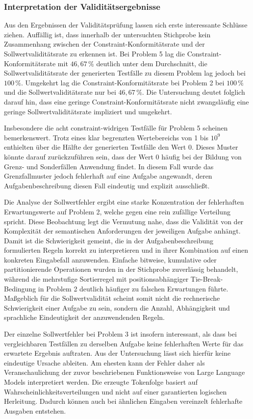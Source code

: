 \subsubsection{Interpretation der Validitätsergebnisse}
Aus den Ergebnissen der Validitätsprüfung lassen sich erste interessante Schlüsse ziehen.
Auffällig ist, dass innerhalb der untersuchten Stichprobe kein Zusammenhang zwischen der 
Constraint-Konformitätsrate und der Sollwertvaliditätsrate zu erkennen ist. Bei Problem 5 lag die 
Constraint-Konformitätsrate mit \(46{,}67\,\%\) deutlich unter dem Durchschnitt, die Sollwertvaliditätsrate 
der generierten Testfälle zu diesem Problem lag jedoch bei \(100\,\%\). 
Umgekehrt lag die Constraint-Konformitätsrate bei Problem 2 bei \(100\,\%\) und die Sollwertvaliditätsrate 
nur bei \(46{,}67\,\%\). Die Untersuchung deutet folglich darauf hin, dass eine geringe Constraint-Konformitätsrate 
nicht zwangsläufig eine geringe Sollwertvaliditätsrate impliziert und umgekehrt.

Insbesondere die acht constraint-widrigen Testfälle für Problem 5 scheinen bemerkenswert. 
Trotz eines klar begrenzten Wertebereichs von 1 bis \(10^9\) enthielten über die Hälfte der generierten Testfälle den Wert 0. 
Dieses Muster könnte darauf zurückzuführen sein, dass der Wert 0 häufig bei der Bildung von Grenz- und Sonderfällen Anwendung findet. 
In diesem Fall wurde das Grenzfallmuster jedoch fehlerhaft auf eine Aufgabe angewandt, deren Aufgabenbeschreibung diesen Fall eindeutig 
und explizit ausschließt.

Die Analyse der Sollwertfehler ergibt eine starke Konzentration der fehlerhaften Erwartungswerte auf Problem 2, 
welche gegen eine rein zufällige Verteilung spricht. 
Diese Beobachtung legt die Vermutung nahe, dass die Validität von der Komplexität der semantischen Anforderungen der jeweiligen Aufgabe
anhängt. Damit ist die Schwierigkeit gemeint, die in der Aufgabenbeschreibung formulierten Regeln korrekt 
zu interpretieren und in ihrer Kombination auf einen konkreten Eingabefall anzuwenden.
Einfache bitweise, kumulative oder partitionierende Operationen wurden in der Stichprobe zuverlässig behandelt, während die
mehrstufige Sortierregel mit positionsabhängiger Tie-Break-Bedingung in Problem 2 deutlich häufiger zu falschen Erwartungen führte. 
Maßgeblich für die Sollwertvalidität scheint somit nicht die rechnerische Schwierigkeit einer Aufgabe zu sein, sondern die Anzahl, 
Abhängigkeit und sprachliche Eindeutigkeit der anzuwendenden Regeln.

Der einzelne Sollwertfehler bei Problem 3 ist insofern interessant, als dass bei vergleichbaren Testfällen zu derselben Aufgabe keine fehlerhaften Werte für das erwartete 
Ergebnis auftraten. 
Aus der Untersuchung lässt sich hierfür keine eindeutige Ursache ableiten. Am ehesten kann der Fehler daher als Veranschaulichung der zuvor beschriebenen Funktionsweise 
von Large Language Models interpretiert werden. Die erzeugte Tokenfolge basiert auf Wahrscheinlichkeitsverteilungen und nicht auf einer garantierten logischen Herleitung. 
Dadurch können auch bei ähnlichen Eingaben vereinzelt fehlerhafte Ausgaben entstehen.



